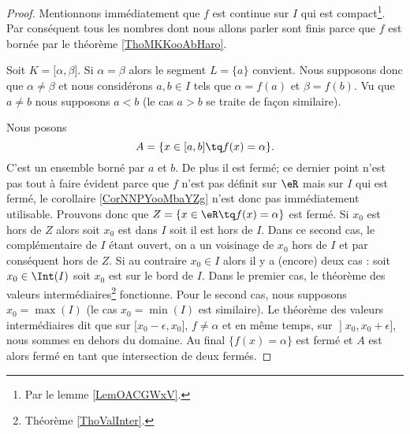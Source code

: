 \begin{proof}
    Mentionnons immédiatement que \( f\) est continue sur \( I\) qui est compact\footnote{Par le lemme \ref{LemOACGWxV}.}. Par conséquent tous les nombres dont nous allons parler sont finis parce que \( f\) est bornée par le théorème \ref{ThoMKKooAbHaro}.

    Soit \( K=\mathopen[ \alpha , \beta \mathclose]\). Si \( \alpha=\beta\) alors le segment \( L=\{ a \}\) convient. Nous supposons donc que \( \alpha\neq \beta\) et nous considérons \( a,b\in I\) tels que \( \alpha=f(a)\) et \( \beta=f(b)\). Vu que \( a\neq b\) nous supposons \( a<b\) (le cas \( a>b\) se traite de façon similaire).

    Nous posons
    \begin{equation}
        A=\{ x\in\mathopen[ a , b \mathclose]\tq f(x)=\alpha \}.
    \end{equation}
    C'est un ensemble borné par \( a\) et \( b\). De plus il est fermé; ce dernier point n'est pas tout à faire évident parce que \( f\) n'est pas définit sur \( \eR\) mais sur \( I\) qui est fermé, le corollaire \ref{CorNNPYooMbaYZg} n'est donc pas immédiatement utilisable. Prouvons donc que \( Z=\{ x\in \eR\tq f(x)=\alpha \}\) est fermé. Si \( x_0\) est hors de \( Z\) alors soit \( x_0\) est dans \( I\) soit il est hors de \( I\). Dans ce second cas, le complémentaire de \( I\) étant ouvert, on a un voisinage de \( x_0\) hors de \( I\) et par conséquent hors de \( Z\). Si au contraire \( x_0\in I\) alors il y a (encore) deux cas : soit \( x_0\in\Int(I)\) soit \( x_0\) est sur le bord de \( I\). Dans le premier cas, le théorème des valeurs intermédiaires\footnote{Théorème \ref{ThoValInter}.} fonctionne. Pour le second cas, nous supposons \( x_0=\max(I)\) (le cas \( x_0=\min(I)\) est similaire). Le théorème des valeurs intermédiaires dit que sur \( \mathopen[ x_0-\epsilon , x_0 \mathclose]\), \( f\neq \alpha\) et en même temps, sur \( \mathopen] x_0 , x_0+\epsilon \mathclose]\), nous sommes en dehors du domaine. Au final \( \{ f(x)=\alpha \}\) est fermé et \( A\) est alors fermé en tant que intersection de deux fermés.


\end{proof}

